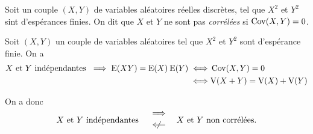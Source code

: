 \begin{defn}
	Soit un couple $(X, Y)$ de variables aléatoires réelles discrètes, tel que $X^2$ et $Y^2$ sint d'espérances finies. On dit que $X$ et $Y$ ne sont pas \textit{corrélées} si $\operatorname{Cov}(X, Y) = 0$.
\end{defn}

\begin{thm}
	Soit $(X, Y)$ un couple de variables aléatoires tel que $X^2$ et $Y^2$ sont d'espérance finie. On a
	\begin{align*}
		X \text{ et } Y \text{ indépendantes } \implies \mathrm{E}(XY) = \mathrm{E}(X)\:\mathrm{E}(Y) \iff& \operatorname{Cov}(X,Y) = 0\\
		\iff& \mathrm{V}(X + Y) = \mathrm{V}(X) + \mathrm{V}(Y)
	\end{align*}
\end{thm}

On a donc \[
	X \text{ et } Y \text{ indépendantes }\quad \substack{\ds\implies\\[2mm] \ds\centernot{\impliedby}} \quad X \text{ et } Y \text{ non corrélées}
.\]

